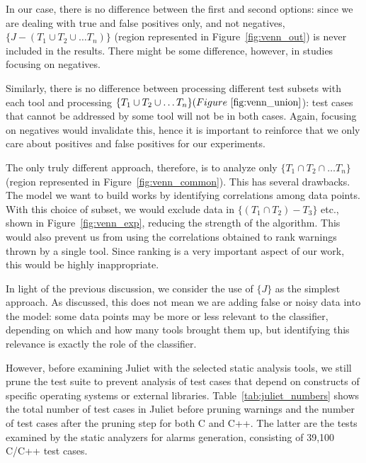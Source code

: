 

In our case, there is no difference
between the first and second options: since we are dealing with
true and false positives only, and not negatives, $\{J - (T_1 \cup T_2\cup\dots T_n)\}$
(region represented in Figure~\ref{fig:venn_out})
is never included in the results. There might be some difference,
however, in studies focusing on negatives.



Similarly, there is no difference between processing different test subsets
with each tool and processing $\{T_1 \cup T_2\cup\dots T_n\}
(Figure~\ref{fig:venn_union}$): test cases that cannot be addressed by some
tool will not be in both cases. Again, focusing on negatives would invalidate
this, hence it is important to reinforce that we only care about positives and
false positives for our experiments.



The only truly different approach, therefore, is to analyze only $\{T_1 \cap
T_2 \cap\dots T_n\}$ (region represented in Figure~\ref{fig:venn_common}). This
has several drawbacks. The model we want to build works by identifying
correlations among data points. With this choice of subset, we would exclude
data in $\{(T_1 \cap T_2) - T_3\}$ etc., shown in Figure~\ref{fig:venn_exp}, reducing the strength of the
algorithm. This would also prevent us from using the correlations obtained to
rank warnings thrown by a single tool.  Since ranking is a very important
aspect of our work, this would be highly inappropriate.





In light of the previous discussion, we consider the use
of $\{J\}$ as the simplest approach. As discussed, this does
not mean we are adding false or noisy data into the
model: some data points may be more or less relevant to the
classifier, depending on which and how many tools brought
them up, but identifying this relevance is exactly the
role of the classifier.

However, before examining Juliet with the selected static analysis tools, we still prune the
test suite to prevent analysis of test cases that depend on constructs of
specific operating systems or external libraries.
Table~\ref{tab:juliet_numbers} shows the total number of test cases in Juliet
before pruning warnings and the number of test cases after the pruning step for
both C and C++. The latter are the tests examined by the static analyzers for
alarms generation, consisting of 39,100 C/C++ test cases.

